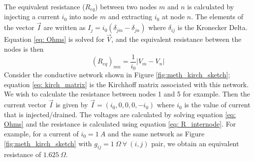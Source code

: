The equivalent resistance ($R_{eq}$) between two nodes $\textit{m}$ and $\textit{n}$ is calculated by injecting a current $i_0$ into node $\textit{m}$ and extracting $i_0$ at node $\textit{n}$. The elements of the vector $\vec{I}$ are written as $I_\textit{j} = i_0(\delta_{\textit{jm}}-\delta_{\textit{jn}})$ where $\delta_{\textit{ij}}$ is the Kronecker Delta. Equation \ref{eq: Ohms} is solved for $\vec{V}$, and the equivalent resistance between the nodes is then
\begin{equation}
(R_{eq})_{\textit{mn}}=\frac{1}{i_0} \vert V_\textit{m} - V_\textit{n} \vert
\label{eq: R_internode}
\end{equation}
Consider the conductive network shown in Figure \ref{fig:meth_kirch_sketch}; equation \ref{eq: kirch_matrix} is the Kirchhoff matrix associated with this network. We wish to calculate the resistance between nodes 1 and 5 for example. Then the current vector $\vec{I}$ is given by $\vec{I}=(i_0,0,0,0,-i_0)$ where $i_0$ is the value of current that is injected/drained. The voltages are calculated by solving equation \ref{eq: Ohms} and the resistance is calculated using equation \ref{eq: R_internode}. For example, for a current of $i_0 = 1 ~A$ and the same network as Figure \ref{fig:meth_kirch_sketch} with $g_{ij} = 1~\Omega ~ \forall ~ (i,j)$ pair, we obtain an equivalent resistance of $1.625~\Omega$.

